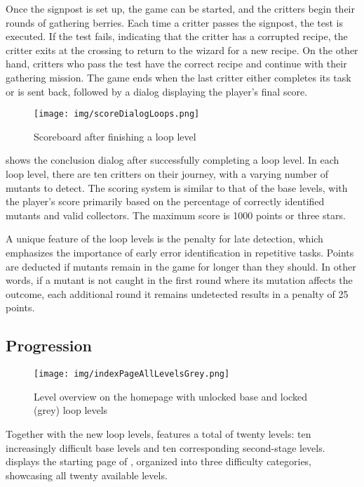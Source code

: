 Once the signpost is set up, the game can be started, and the critters begin their rounds of gathering berries. Each time a critter passes the signpost, the test is executed. If the test fails, indicating that the critter has a corrupted recipe, the critter exits at the crossing to return to the wizard for a new recipe. On the other hand, critters who pass the test have the correct recipe and continue with their gathering mission. The game ends when the last critter either completes its task or is sent back, followed by a dialog displaying the player's final score.

\begin{figure}[t]
	\centering
	\texttt{[image: img/scoreDialogLoops.png]}
	\caption{Scoreboard after finishing a loop level}
	\label{fig:scoreLoop}
\end{figure}

 shows the conclusion dialog after successfully completing a loop level. In each loop level, there are ten critters on their journey, with a varying number of mutants to detect. The scoring system is similar to that of the base levels, with the player's score primarily based on the percentage of correctly identified mutants and valid collectors. The maximum score is 1000 points or three stars.

A unique feature of the loop levels is the penalty for late detection, which emphasizes the importance of early error identification in repetitive tasks. Points are deducted if mutants remain in the game for longer than they should. In other words, if a mutant is not caught in the first round where its mutation affects the outcome, each additional round it remains undetected results in a penalty of 25 points.


\subsection{Progression}

\begin{figure}
	\centering
	\texttt{[image: img/indexPageAllLevelsGrey.png]}
	\caption{Level overview on the homepage with unlocked base and locked (grey) loop levels}
	\label{fig:allLevels}
\end{figure}

Together with the new loop levels, \toolname features a total of twenty levels: ten increasingly difficult base levels and ten corresponding second-stage levels.  displays the starting page of \toolname, organized into three difficulty categories, showcasing all twenty available levels.

